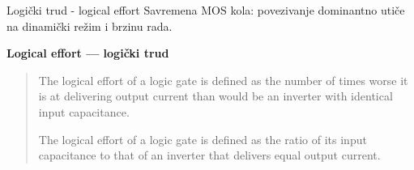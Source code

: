 \begin{frame}[label=08-s033]{Logički trud - logical effort}
Savremena MOS kola: povezivanje dominantno utiče na \alert{dinamički režim} i brzinu rada.\par\medskip
\textbf{Logical effort — logički trud}\par\medskip
\begin{quote}\upshape
The logical effort of a logic gate is defined as the number of times worse it is at delivering output current than would be an inverter with identical input capacitance.\par\medskip
The logical effort of a logic gate is defined as the ratio of its input capacitance to that of an inverter that delivers equal output current.
\end{quote}
\end{frame}
